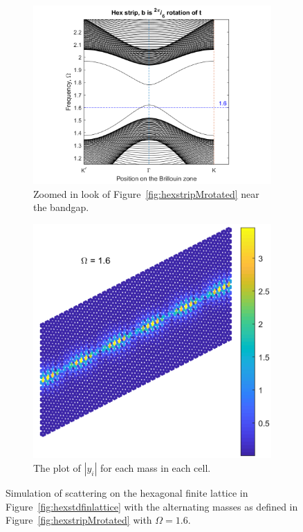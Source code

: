\begin{figure}
\centering
\begin{subfigure}[b]{.5\textwidth}
  \centering
  \includegraphics[width=1.1\linewidth]{imgs/hexstripperturbMrotatedzoom.png}
  \caption{Zoomed in look of Figure~\ref{fig:hexstripMrotated} near the bandgap.}
  \label{fig:hexstripMrotatedzooms1}
\end{subfigure}%
\begin{subfigure}[b]{.5\textwidth}
  \centering
  \includegraphics[width=1\linewidth]{imgs/hexstdrotstraight.png}
  \caption{The plot of $|y_i|$ for each mass in each cell.}
  \label{fig:sub2}
\end{subfigure}
\caption{Simulation of scattering on the hexagonal finite lattice in
  Figure~\ref{fig:hexstdfinlattice} with the alternating masses as defined in
  Figure~\ref{fig:hexstripMrotated} with $\Omega = 1.6$.}
\label{fig:hexstdrotstraight}
\end{figure}


